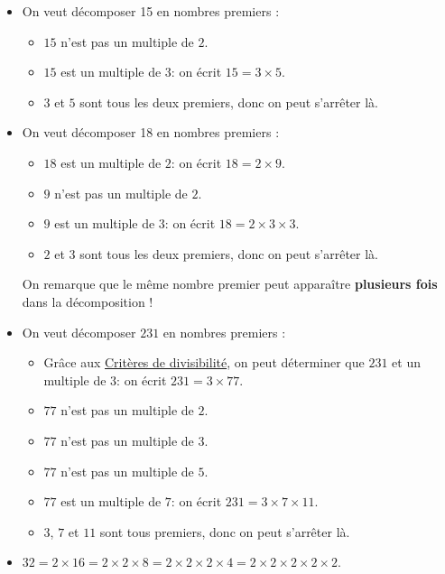 \documentclass[a4paper]{article}
\begin{document}
\begin{exemple}
	\begin{itemize}
		\item On veut décomposer 15 en nombres premiers :
		      \begin{itemize}
			      \item $15$ n'est pas un multiple de $2$.
			      \item $15$ est un multiple de $3$: on écrit $15 = 3 × 5$.
			      \item $3$ et $5$ sont tous les deux premiers, donc on peut s'arrêter là.
		      \end{itemize}
		\item On veut décomposer 18 en nombres premiers :
		      \begin{itemize}
			      \item $18$ est un multiple de $2$: on écrit $18 = 2 × 9$.
			      \item $9$ n'est pas un multiple de $2$.
			      \item $9$ est un multiple de $3$: on écrit $18 = 2 × 3 × 3$.
			      \item $2$ et $3$ sont tous les deux premiers, donc on peut s'arrêter là.
		      \end{itemize}
		      On remarque que le même nombre premier peut apparaître \textbf{plusieurs fois} dans la décomposition !
		\item On veut décomposer $231$ en nombres premiers :
		      \begin{itemize}
			      \item Grâce aux \hyperref[cours:criteres-de-divisibilite]{Critères de divisibilité}, on peut déterminer que $231$ et un multiple de $3$: on écrit $231 = 3 × 77$.
			      \item $77$ n'est pas un multiple de $2$.
			      \item $77$ n'est pas un multiple de $3$.
			      \item $77$ n'est pas un multiple de $5$.
			      \item $77$ est un multiple de $7$: on écrit $231 = 3 × 7 × 11$.
			      \item $3$, $7$ et $11$ sont tous premiers, donc on peut s'arrêter là.
		      \end{itemize}
		\item $32 = 2 × 16 = 2 × 2 × 8 = 2 × 2 × 2 × 4 = 2 × 2 × 2 × 2 × 2$.
	\end{itemize}
\end{exemple}
\end{document}
